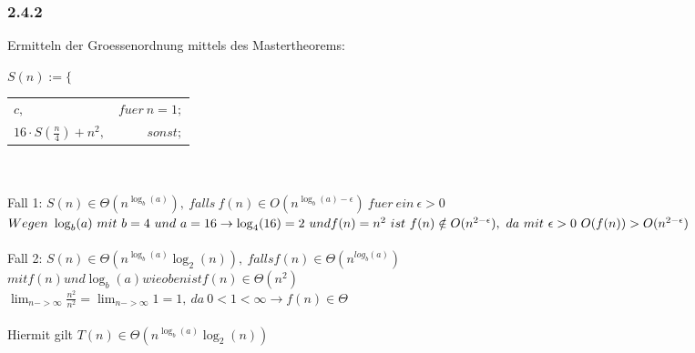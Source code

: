 \subsubsection*{2.4.2} 
Ermitteln der Groessenordnung mittels des Mastertheorems:
 
$ S(n) :=  \{ $
\begin{tabular}{lr}
$c,$&$ fuer\ n = 1;$\\
$16 \cdot S(\frac{n}{4}) + n^2,$&$ sonst; $ \\
\end{tabular}\\\\
Fall 1: $S(n) \in \Theta(n^{\log_b(a)}),\ falls\ f(n) \in O(n^{\log_b(a)-\epsilon})\ fuer\ ein\ \epsilon>0$\\
$Wegen\ \log_b(a)\ mit\ b=4\ und\ a=16 \to \log_4(16)=2\ und\\ f(n)=n^2\ ist\ f(n) \notin O(n^{2-\epsilon}),\ da\ mit\ \epsilon > 0\ O(f(n)) > O(n^{2- \epsilon})$\\\\
Fall 2: $S(n) \in \Theta(n^{\log_b(a)}\log_2(n)),\ falls f(n) \in \Theta(n^{log_b(a)})$\\
$mit f(n) und \log_b(a) wie oben ist f(n) \in \Theta(n^2)$\\
$\lim_{n->\infty} \frac{n^2}{n^2} = \lim_{n->\infty} 1 = 1,\ da\ 0 < 1 < \infty \to f(n) \in \Theta$\\\\
Hiermit gilt $T(n) \in \Theta(n^{\log_b(a)}\log_2(n))$

